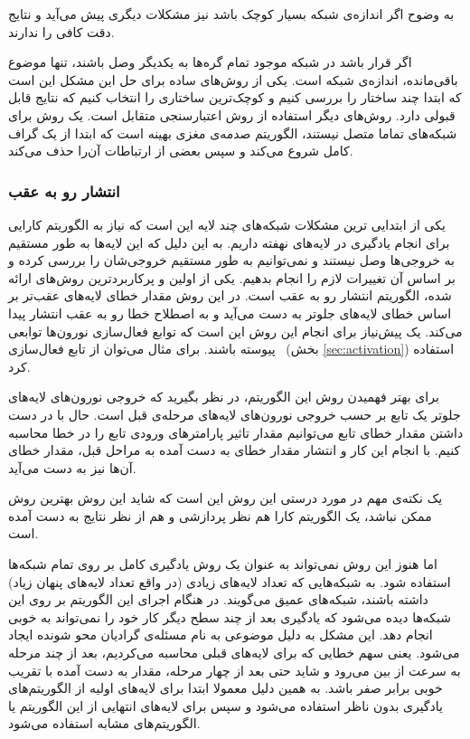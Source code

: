 \documentclass[11pt,a4paper,twocolumn]{article}
\begin{document}
به وضوح اگر اندازه‌ی شبکه بسیار کوچک باشد نیز
مشکلات دیگری
پیش می‌آید و نتایج دقت کافی را ندارند.

اگر قرار باشد در شبکه موجود تمام گره‌ها به یکدیگر وصل باشند، تنها موضوع باقی‌مانده، اندازه‌ی شبکه است. یکی از روش‌های ساده برای حل این مشکل این است که ابتدا چند ساختار را بررسی کنیم و کوچک‌ترین ساختاری را انتخاب کنیم که نتایج قابل قبولی دارد. روش‌های دیگر استفاده از روش
اعتبار‌سنجی متقابل
است. یک روش برای شبکه‌های تماما متصل نیستند، الگوریتم
صدمه‌ی مغزی بهینه
است که ابتدا از یک گراف کامل شروع می‌کند و سپس بعضی از ارتباطات آن‌را حذف می‌کند.
\cite[ص-۷۳۷]{russell}

\subsubsection{انتشار رو به عقب}
یکی از ابتدایی ترین مشکلات شبکه‌های چند لایه این است که نیاز به الگوریتم کارایی برای انجام یادگیری در لایه‌های نهفته داریم. به این دلیل که این لایه‌ها به طور مستقیم به خروجی‌ها وصل نیستند و نمی‌توانیم به طور مستقیم خروجی‌شان را بررسی کرده و بر اساس آن تغییرات لازم را انجام بدهیم. یکی از اولین و پرکاربردترین روش‌های ارائه شده، الگوریتم
انتشار رو به عقب
است. در این روش مقدار خطای لایه‌های عقب‌تر بر اساس خطای لایه‌های جلو‌تر به دست می‌آید و به اصطلاح خطا رو به عقب انتشار پیدا می‌کند. یک پیش‌نیاز برای انجام این روش این است که توابع فعال‌سازی نورون‌ها توابعی پیوسته باشند. برای مثال می‌توان از تابع فعال‌سازی \
(بخش \ref{sec:activation})
استفاده کرد.

برای بهتر فهمیدن روش این الگوریتم، در نظر بگیرید که خروجی نورون‌های لایه‌های جلو‌تر یک تابع بر حسب خروجی نورون‌های لایه‌های مرحله‌ی قبل است. حال با در دست داشتن مقدار خطای‌ تابع می‌توانیم مقدار تاثیر پارامتر‌های ورودی تابع را در خطا محاسبه کنیم. با انجام این کار و انتشار مقدار خطای به دست آمده به مراحل قبل، مقدار خطای آن‌ها نیز به دست می‌آید.\cite{ml-hinton}

یک نکته‌ی مهم در مورد درستی این روش این است که شاید این روش بهترین روش ممکن نباشد، یک الگوریتم کارا هم نظر پردازشی و هم از نظر نتایج به دست آمده است.

اما هنوز این روش نمی‌تواند به عنوان یک روش یادگیری کامل بر روی تمام شبکه‌ها استفاده شود. به شبکه‌‌هایی که تعداد لایه‌های زیادی (در واقع تعداد لایه‌های پنهان زیاد) داشته باشند،
شبکه‌های عمیق\LTRfootnote{deep networks}
می‌گویند. در هنگام اجرای این الگوریتم بر روی این شبکه‌ها دیده می‌شود که یادگیری بعد از چند سطح دیگر کار خود را نمی‌تواند به خوبی انجام دهد. این مشکل به دلیل موضوعی به نام
مسئله‌ی گرادیان محو شونده\LTRfootnote{Vanishing Gradient problem} ایجاد می‌شود. 
یعنی سهم خطایی که برای لایه‌های قبلی محاسبه می‌کردیم، بعد از چند مرحله به سرعت از بین می‌رود و شاید حتی بعد از چهار مرحله، مقدار به دست آمده با تقریب خوبی برابر صفر باشد. به همین دلیل معمولا ابتدا برای لایه‌های اولیه از الگوریتم‌های یادگیری بدون ناظر استفاده می‌شود و سپس برای لایه‌های انتهایی از این الگوریتم یا الگوریتم‌های مشابه استفاده می‌شود.
	
\end{document}
